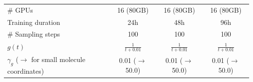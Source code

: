 \documentclass{article}
\theoremstyle{plain}
\theoremstyle{definition}
\theoremstyle{remark}
\begin{document}
\begin{table}[ht]
{\begin{tabular}{lccc}
\# GPUs                   & 16 (80GB)                     & 16 (80GB)                    & 16 (80GB)                      \\
Training duration         & 24h                   & 48h                  & 96h                    \\ \midrule
\# Sampling steps         & 100                   & 100                  & 100                    \\
$g(t)$                    & $\frac{1}{t+0.01}$    & $\frac{1}{t+0.01}$   & $\frac{1}{t+0.01}$     \\
$\gamma_g$ ($\rightarrow$ for small molecule coordinates)                  & 0.01 ($\rightarrow$ 50.0)                  & 0.01 ($\rightarrow$ 50.0)                 & 0.01 ($\rightarrow$ 50.0)                   \\ \bottomrule
\end{tabular}
}%
\end{table}
\end{document}
